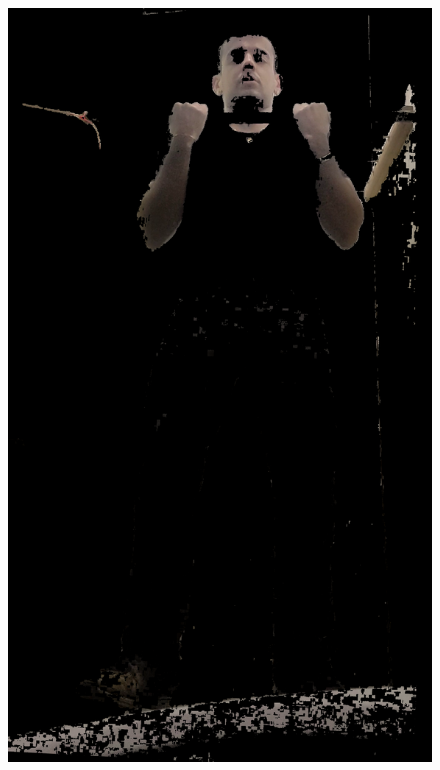 \begin{figure}[!htbp]
\begin{minipage}{\sizeImg\textwidth}
            \includegraphics[width=\textwidth]{figuras/ultrapassar_barra/134_skin.png}
        \end{minipage}
\end{figure}
